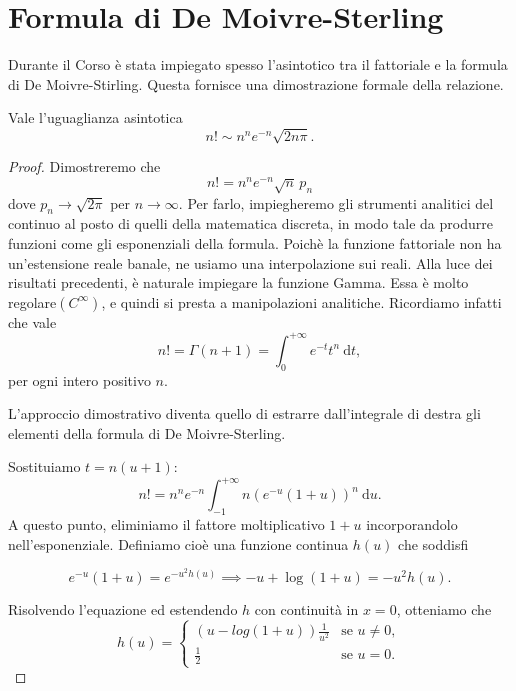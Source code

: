 \chapter{Formula di De Moivre-Sterling}
Durante il Corso è stata impiegato spesso l'asintotico tra il fattoriale e la formula di De Moivre-Stirling. Questa fornisce una dimostrazione formale della relazione.

\begin{Res} Vale l'uguaglianza asintotica
	\[
		n!\sim n^ne^{-n}\sqrt{2n\pi}.
	\]
\end{Res}

\begin{proof}
	Dimostreremo che
	\[
		n! = n^n e^{-n} \sqrt{n} \, p_n	
	\]
	dove $p_n\to\sqrt{2\pi}$ per $n \to \infty$. Per farlo, impiegheremo gli strumenti analitici del continuo al posto di quelli della matematica discreta, in modo tale da produrre funzioni come gli esponenziali della formula. Poichè la funzione fattoriale non ha un'estensione reale banale, ne usiamo una interpolazione sui reali. Alla luce dei risultati precedenti, è naturale impiegare la funzione Gamma. Essa è molto regolare$(C^\infty
	)$, e quindi si presta a manipolazioni analitiche. Ricordiamo infatti che vale
	\[
		n!=\Gamma(n+1)=\int^{+\infty}_0e^{-t}t^n \:\mathrm{d}t,
	\]
	per ogni intero positivo $n$.

	L'approccio dimostrativo diventa quello di estrarre dall'integrale di destra gli elementi della formula di De Moivre-Sterling.

	Sostituiamo $t=n(u+1)$:
	\[
		n!=n^ne^{-n}\int^{+\infty}_{-1}n\left( e^{-u}(1+u)\right)^n \:\mathrm{d}u.
	\]
	A questo punto, eliminiamo il fattore moltiplicativo $1+u$ incorporandolo nell'esponenziale. Definiamo cioè una funzione continua $h(u)$ che soddisfi

	\begin{equation}
		\label{res2}
		e^{-u}(1+u)=e^{-u^2 h(u)} \implies -u+\log(1+u)=-u^2h(u).
	\end{equation}

	Risolvendo l'equazione ed estendendo $h$ con continuità in $x=0$, otteniamo che
	\begin{equation*}
		h(u)=
		\begin{cases}
			(u-log(1+u))\frac{1}{u^2} & \text{se } u\neq0, \\
			\frac{1}{2}               & \text{se }  u=0.
		\end{cases}
	\end{equation*}


\end{proof}
